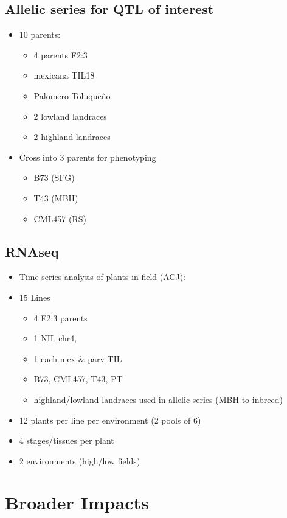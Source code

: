 \documentclass[]{article}
\begin{document}
\subsection{Allelic series for QTL of interest}
\begin{itemize}
\item 10 parents:
\begin{itemize}
\item 4 parents F2:3
\item mexicana TIL18
\item Palomero Toluqueño
\item 2 lowland landraces
\item 2 highland landraces
\end{itemize}
\item Cross into 3 parents for phenotyping
\begin{itemize}
\item B73 (SFG)
\item T43 (MBH)
\item CML457 (RS)
\end{itemize}
\end{itemize}

\subsection{RNAseq}
\begin{itemize}
\item Time series analysis of plants in field (ACJ):
\item 15 Lines
\begin{itemize}
\item 4 F2:3 parents
\item 1 NIL chr4,
\item 1 each mex \& parv TIL
\item B73, CML457, T43, PT
\item highland/lowland landraces used in allelic series (MBH to inbreed)
\end{itemize}
\item 12 plants per line per environment (2 pools of 6)
\item 4 stages/tissues per plant
\item 2 environments (high/low fields)
\end{itemize}

\section{Broader Impacts}
\end{document}
